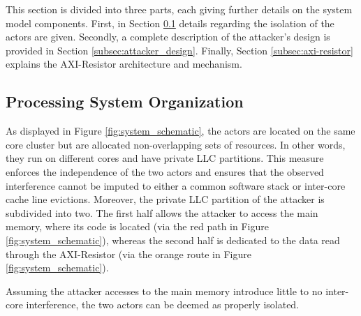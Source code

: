     This section is divided into three parts, each giving further details on the system model components.
    First, in Section \ref{subsec:processing_system_organization} details regarding the isolation of the actors are given.
    Secondly, a complete description of the attacker's design is provided in Section \ref{subsec:attacker_design}.
    Finally, Section \ref{subsec:axi-resistor} explains the AXI-Resistor architecture and mechanism.

    \subsection{Processing System Organization}
        \label{subsec:processing_system_organization}
        As displayed in Figure \ref{fig:system_schematic}, the actors are located on the same core cluster but are allocated non-overlapping sets of resources.
        In other words, they run on different cores and have private LLC partitions.
        This measure enforces the independence of the two actors and ensures that the observed interference cannot be imputed to either a common software stack or inter-core cache line evictions.
        Moreover, the private LLC partition of the attacker is subdivided into two.
        The first half allows the attacker to access the main memory, where its code is located (via the red path in Figure \ref{fig:system_schematic}), whereas the second half is dedicated to the data read through the AXI-Resistor (via the orange route in Figure \ref{fig:system_schematic}).

        Assuming the attacker accesses to the main memory introduce little to no inter-core interference, the two actors can be deemed as properly isolated.



